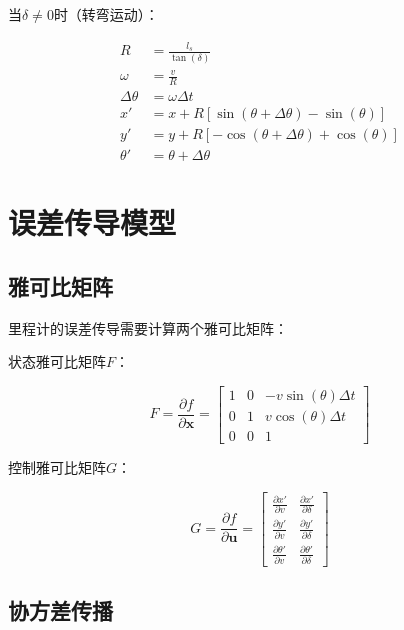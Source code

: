 \documentclass[12pt,a4paper]{report}
\begin{document}
当$\delta \neq 0$时（转弯运动）：

\begin{align}
R &= \frac{l_s}{\tan(\delta)} \\
\omega &= \frac{v}{R} \\
\Delta\theta &= \omega \Delta t \\
x' &= x + R[\sin(\theta + \Delta\theta) - \sin(\theta)] \\
y' &= y + R[-\cos(\theta + \Delta\theta) + \cos(\theta)] \\
\theta' &= \theta + \Delta\theta
\end{align}

\section{误差传导模型}

\subsection{雅可比矩阵}

里程计的误差传导需要计算两个雅可比矩阵：

状态雅可比矩阵$F$：

\begin{equation}
F = \frac{\partial f}{\partial \mathbf{x}} = 
\begin{bmatrix}
1 & 0 & -v\sin(\theta)\Delta t \\
0 & 1 & v\cos(\theta)\Delta t \\
0 & 0 & 1
\end{bmatrix}
\end{equation}

控制雅可比矩阵$G$：

\begin{equation}
G = \frac{\partial f}{\partial \mathbf{u}} = 
\begin{bmatrix}
\frac{\partial x'}{\partial v} & \frac{\partial x'}{\partial \delta} \\
\frac{\partial y'}{\partial v} & \frac{\partial y'}{\partial \delta} \\
\frac{\partial \theta'}{\partial v} & \frac{\partial \theta'}{\partial \delta}
\end{bmatrix}
\end{equation}

\subsection{协方差传播}
\end{document}
